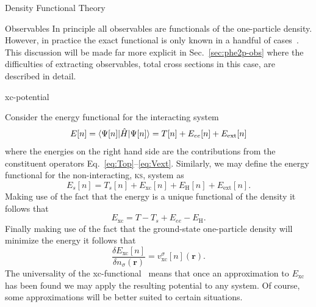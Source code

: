 \documentclass[letterpaper, 11 pt]{report}
\begin{document}
\begin{chapter}{Density Functional Theory \label{chap:dft}}
\begin{section}{Observables \label{sec:obs}}
      In principle all observables are functionals of the one-particle density. However, in practice the
      exact functional is only known in a handful of cases~\cite[p.~211-213]{obs_exac}. This discussion
      will be made far more explicit in Sec.~\ref{sec:phe2p-obs} where the difficulties of extracting
      observables, total cross sections in this case, are described in detail.

   \end{section}

   \begin{section}{xc-potential \label{sec:xcpot}}

      Consider the energy functional for the interacting system
      \begin{equation} \label{eq:efunc}
         E[n] = \braket{\Psi[n] | \hat{H} | \Psi[n] }= T[n] + E_{ee}[n] + E_\mathrm{ext}[n]
      \end{equation}
      where the energies on the right hand side are the contributions from the constituent operators
      Eq.~\eqref{eq:Top}--\eqref{eq:Vext}. Similarly, we may define the energy functional for the
      non-interacting, \textsc{ks}, system as
      \begin{equation} \label{eq:esfunc}
         E_s[n] =  T_s[n] + E_\mathrm{xc}[n] + E_\mathrm{H}[n] + E_\mathrm{ext}[n].
      \end{equation}
      Making use of the fact that the energy is a unique functional of the density it follows that
      \begin{equation} \label{eq:exc}
         E_\mathrm{xc} = T - T_s + E_{ee} - E_\mathrm{H}.
      \end{equation}
      Finally making use of the fact that the ground-state one-particle density will minimize the energy
      it follows that
      \begin{equation} \label{eq:vxc-der}
         \frac{\delta E_\mathrm{xc}[n]}{\delta n_\sigma(\mathbf{r})}
            = v^\sigma_\mathrm{xc}[n](\mathbf{r}).
      \end{equation}
      The universality of the xc-functional~\cite{dft-engel} means that once an approximation to
      $E_\mathrm{xc}$ has been found we may apply the resulting potential to any system. Of course,
      some approximations will be better suited to certain situations.


\end{section}
\end{chapter}
\end{document}

